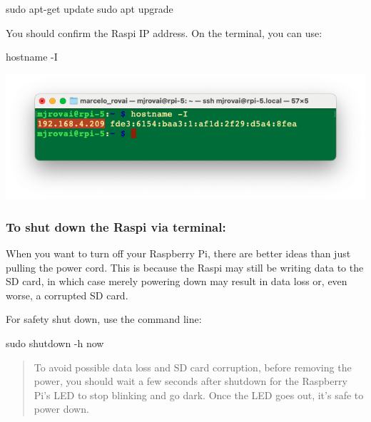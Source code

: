 \documentclass[
]{article}
\newenvironment{Shaded}{\begin{snugshade}}{\end{snugshade}}
\newcommand{\AttributeTok}[1]{\textcolor[rgb]{0.40,0.45,0.13}{#1}}
\newcommand{\FunctionTok}[1]{\textcolor[rgb]{0.28,0.35,0.67}{#1}}
\newcommand{\NormalTok}[1]{\textcolor[rgb]{0.00,0.23,0.31}{#1}}
\begin{document}
\begin{enumerate}
\begin{Shaded}
\begin{Highlighting}[]
\FunctionTok{sudo}\NormalTok{ apt{-}get update}
\FunctionTok{sudo}\NormalTok{ apt upgrade}
\end{Highlighting}
\end{Shaded}

  You should confirm the Raspi IP address. On the terminal, you can use:

\begin{Shaded}
\begin{Highlighting}[]
\FunctionTok{hostname} \AttributeTok{{-}I}
\end{Highlighting}
\end{Shaded}
\end{enumerate}

\noindent \begin{center}
\includegraphics[width=0.85\linewidth,height=\textheight,keepaspectratio]{images/png/pasted_graphic_11_ilcmyoyu7x.png}
\end{center}

\subsubsection{To shut down the Raspi via
terminal:}\label{sec-setup-shut-raspi-via-terminal-c248}

When you want to turn off your Raspberry Pi, there are better ideas than
just pulling the power cord. This is because the Raspi may still be
writing data to the SD card, in which case merely powering down may
result in data loss or, even worse, a corrupted SD card.

For safety shut down, use the command line:

\begin{Shaded}
\begin{Highlighting}[]
\FunctionTok{sudo}\NormalTok{ shutdown }\AttributeTok{{-}h}\NormalTok{ now}
\end{Highlighting}
\end{Shaded}

\begin{quote}
To avoid possible data loss and SD card corruption, before removing the
power, you should wait a few seconds after shutdown for the Raspberry
Pi's LED to stop blinking and go dark. Once the LED goes out, it's safe
to power down.
\end{quote}
\end{document}
